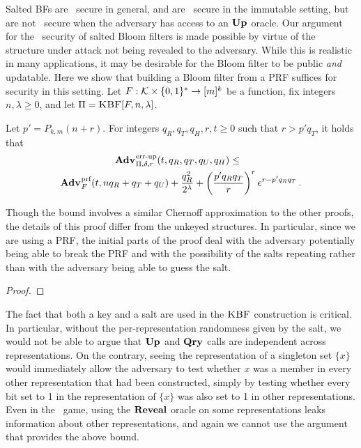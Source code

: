 Salted BFs are \erreps\ secure in general, and are \errep\ secure in the
immutable setting, but are not \errep\ secure when the adversary has access to
an $\textup{\textbf{Up}}\hspace{0.5pt}$ oracle. Our argument for the \erreps\ security of
salted Bloom filters is made possible by virtue of the structure under attack
not being revealed to the adversary. While this is realistic in many
applications, it may be desirable for the Bloom filter to be public \emph{and}
updatable.
%
Here we show that building a Bloom filter from a PRF suffices for security in
this setting.
%
Let $F:\mathcal{K}\times\{0,1\}^*\to[m]^k$ be a function, fix
integers~$n,\lambda\geq0$, and let $\Pi = \textnormal{\textsc{KBF}}[F,n,\lambda]$.

\begin{theorem}\label{thm:bf-key-bound}
  Let $p' = P_{k,m}(n+r)$.  For integers $q_R, q_T, q_H, r, t \geq 0$ such that
  $r > p'q_T$, it holds that
  \begin{equation*}
    \begin{aligned}
      \Adv{\errep}_{\Pi,\delta,r}(t,\,&q_R,q_T,q_U,q_H) \leq \\
        \Adv{\prf}_F(t,nq_R+q_T+q_U) & +
      \frac{q_R^2}{2^\lambda} +
      \left(\frac{p'q_Rq_T}{r}\right)^re^{r-p'q_Rq_T} \,.
    \end{aligned}
  \end{equation*}
\end{theorem}

Though the bound involves a similar Chernoff approximation to the other proofs,
the details of this proof differ from the unkeyed structures. In particular,
since we are using a PRF, the initial parts of the proof deal with the adversary
potentially being able to break the PRF and with the possibility of the salts
repeating rather than with the adversary being able to guess the salt.

\begin{proof}
  
\end{proof}

The fact that both a key and a salt are used in the $\textnormal{\textsc{KBF}}$ construction is
critical. In particular, without the per-representation randomness given by the
salt, we would not be able to argue that $\textup{\textbf{Up}}\hspace{0.5pt}$ and $\textup{\textbf{Qry}}\hspace{0.5pt}$ calls are
independent across representations. On the contrary, seeing the representation
of a singleton set $\{x\}$ would immediately allow the adversary to test whether
$x$ was a member in every other representation that had been constructed, simply
by testing whether every bit set to 1 in the representation of $\{x\}$ was also
set to 1 in other representations. Even in the \erreps\ game, using the $\mathbf{Reveal}$
oracle on some representations leaks information about other representations,
and again we cannot use the argument that provides the above bound.

